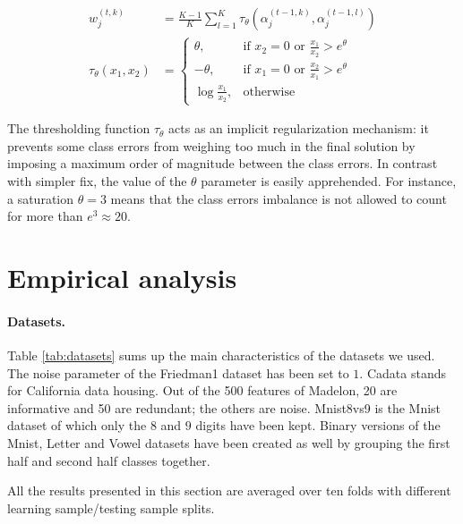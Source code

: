 \documentclass{article}
\begin{document}
\vspace*{-\baselineskip}
\begin{align}\label{eq:METrimmed}
w_j^{(t,k)} &= \frac{K-1}{K} \sum_{l=1}^{K} \tau_{\theta} \left(\alpha_j^{(t-1, 
k)},  \alpha_j^{(t-1, l)}\right)\\
\tau_{\theta}(x_1, x_2) &=\begin{cases}
    \theta, & \text{if $x_2 = 0$ or $\frac{x_1}{x_2} > e^{\theta}$}\\
    -\theta,& \text{if $x_1 = 0$ or $\frac{x_2}{x_1} > e^{\theta}$}\\
    \log \frac{x_1}{x_2}, & \text{otherwise}
  \end{cases}
\end{align}
\vspace*{-\baselineskip}

The thresholding function $\tau_{\theta}$ acts as an implicit regularization 
mechanism: it prevents some class errors from weighing too much in the final 
solution by imposing a maximum order of magnitude between the class errors. In 
contrast with simpler fix, the value of the  $\theta$ parameter is easily 
apprehended.%
For instance, a saturation $\theta=3$ means that the class errors imbalance is 
not allowed to count for more than $e^3 \approx 20$. 




\section{Empirical analysis}
\label{sec:analysis}

\paragraph{Datasets.}
Table \ref{tab:datasets} sums up the main characteristics of the datasets we 
used. The noise parameter of the Friedman1 dataset has been set to $1$. Cadata 
stands for California data housing. Out of the 500 features of Madelon, 20 are 
informative and 50 are redundant; the others are noise. Mnist8vs9 is the Mnist 
dataset of which only the $8$ and $9$ digits have been kept. Binary versions 
of the Mnist, Letter and Vowel datasets have been created as well by grouping 
the first half and second half classes together.

All the results presented in this section are averaged over ten folds with 
different learning sample/testing sample splits.
\end{document}
